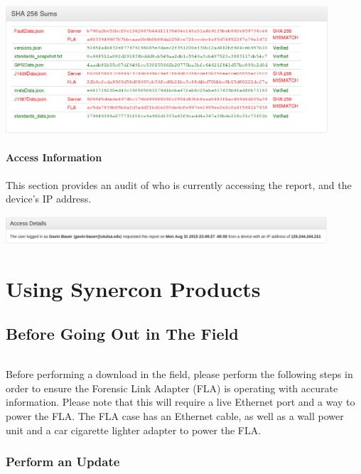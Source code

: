 \documentclass[11pt, oneside]{book}
\begin{document}
\begin{center}
\includegraphics[width=0.9\textwidth]{../media/fla_portal_screenshots/full_report/invalid_shas}
\end{center}

\newpage

\subsection{Access Information}

This section provides an audit of who is currently accessing the report,
and the device's IP address.

\begin{center}
\includegraphics[width=0.9\textwidth]{../media/fla_portal_screenshots/full_report/access_info}
\end{center}


\part{Using Synercon Products}


\chapter{Before Going Out in The Field}
\paragraph{  }
Before performing a download in the field, please perform the following steps in order to ensure the Forensic Link Adapter (FLA) is operating with accurate information. Please note that this will require a live Ethernet port and a way to power the FLA. The FLA case has an Ethernet cable, as well as a wall power unit and a car cigarette lighter adapter to power the FLA.
\section{Perform an Update}
\end{document}
